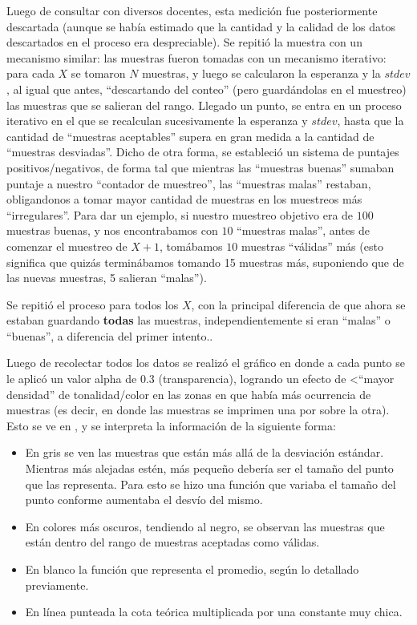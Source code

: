 \documentclass[11pt, a4paper, twoside]{article}
\begin{document}
Luego de consultar con diversos docentes, esta medición fue posteriormente 
descartada (aunque se había estimado que la cantidad y la calidad de los datos 
descartados en el proceso era despreciable). Se repitió la muestra con un mecanismo
similar: las muestras fueron tomadas con un mecanismo iterativo: para cada $X$ 
se tomaron $N$ muestras, y luego se calcularon la esperanza y la $stdev$, al igual
que antes, \enquote{descartando del conteo} (pero guardándolas en el muestreo) 
las muestras que se salieran del rango. Llegado un punto, se entra en un proceso
iterativo en el que se recalculan sucesivamente la esperanza y $stdev$, hasta que 
la cantidad de \enquote{muestras aceptables} supera en gran medida a la cantidad de \enquote{muestras
desviadas}. Dicho de otra forma, se estableció un sistema de puntajes 
positivos/negativos, de forma tal que mientras las \enquote{muestras buenas} 
sumaban puntaje a nuestro \enquote{contador de muestreo}, las \enquote{muestras malas} restaban,
obligandonos a tomar mayor cantidad de muestras en los muestreos más \enquote{irregulares}. 
Para dar un ejemplo, si nuestro muestreo objetivo era de $100$ muestras buenas, 
y nos encontrabamos con $10$ \enquote{muestras malas}, antes de comenzar el muestreo 
de $X+1$, tomábamos $10$ muestras \enquote{válidas} más (esto significa que
quizás terminábamos tomando 15 muestras más, suponiendo que de las nuevas 
muestras, 5 salieran \enquote{malas}).

Se repitió el proceso para todos los $X$, con la principal diferencia de que 
ahora se estaban guardando \textbf{todas} las muestras, independientemente si
eran \enquote{malas} o \enquote{buenas}, a diferencia del primer intento..

Luego de recolectar todos los datos se realizó el gráfico en donde a cada punto
se le aplicó un valor alpha de 0.3 (transparencia), logrando un efecto de
<\enquote{mayor densidad} de tonalidad/color en las zonas en que había más ocurrencia
de muestras (es decir, en donde las muestras se imprimen una por sobre la otra).
Esto se ve en , y se interpreta la información de la siguiente forma:

\begin{itemize}
	\item En gris se ven las muestras que están más allá de la desviación estándar.
	Mientras más alejadas estén, más pequeño debería ser el tamaño del punto que las representa. 
	Para esto se hizo una función que variaba el tamaño del punto conforme aumentaba el desvío del mismo.
	\item En colores más oscuros, tendiendo al negro, se observan las muestras que están dentro del rango 
	de muestras aceptadas como válidas.
	\item En blanco la función que representa el promedio, según lo detallado previamente.
	\item En línea punteada la cota teórica multiplicada por una constante muy chica.
\end{itemize}
\end{document}

